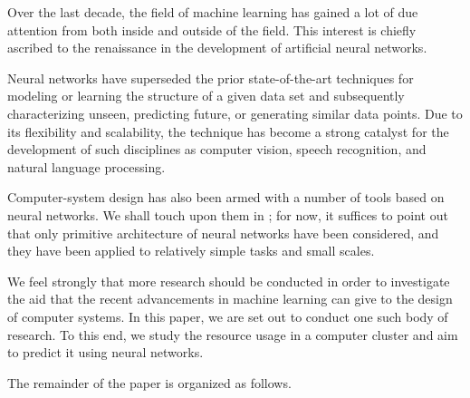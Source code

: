 Over the last decade, the field of machine learning has gained a lot of due
attention from both inside and outside of the field. This interest is chiefly
ascribed to the renaissance in the development of artificial neural networks.

Neural networks have superseded the prior state-of-the-art techniques for
modeling or learning the structure of a given data set and subsequently
characterizing unseen, predicting future, or generating similar data points. Due
to its flexibility and scalability, the technique has become a strong catalyst
for the development of such disciplines as computer vision, speech recognition,
and natural language processing.

Computer-system design has also been armed with a number of tools based on
neural networks. We shall touch upon them in ; for now, it suffices
to point out that only primitive architecture of neural networks have been
considered, and they have been applied to relatively simple tasks and small
scales.

We feel strongly that more research should be conducted in order to investigate
the aid that the recent advancements in machine learning can give to the design
of computer systems. In this paper, we are set out to conduct one such body of
research. To this end, we study the resource usage in a computer cluster and aim
to predict it using neural networks.

The remainder of the paper is organized as follows.

